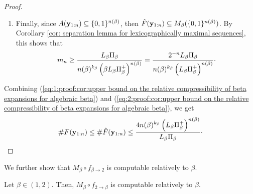 \begin{proof}
\begin{enumerate}[label=(\alph*)]
\begin{equation}
        \end{equation}
        \item Finally, since $A({\bf y}_{1:n}) \subseteq \{0,1\}^{n(\beta)}$, then $\hat F({\bf y}_{1:n}) \subseteq M_\beta(\{0,1\}^{n(\beta)})$. By Corollary \ref{cor: separation lemma for lexicographically maximal sequences}, this shows that 
        \begin{equation}\label{eq:2:proof:cor:upper bound on the relative compressibility of beta expansions for algebraic beta}
            m_n \geq \frac{L_\beta\Pi_\beta}{\displaystyle  n(\beta)^{k_\beta}\left(\beta L_\beta \Pi_\beta^+\right)^{n(\beta)}} = \frac{2^{-n}L_\beta\Pi_\beta}{\displaystyle n(\beta)^{k_\beta}\left(L_\beta \Pi_\beta^+\right)^{n(\beta)}}\cdot
        \end{equation}
    \end{enumerate}
    Combining (\ref{eq:1:proof:cor:upper bound on the relative compressibility of beta expansions for algebraic beta}) and (\ref{eq:2:proof:cor:upper bound on the relative compressibility of beta expansions for algebraic beta}), we get 
    \begin{equation}
       \#F({\bf y}_{1:n}) \leq \# \hat F({\bf y}_{1:n}) \leq \frac{\displaystyle  4n(\beta)^{k_\beta}\left(L_\beta \Pi_\beta^+ \right)^{n(\beta)}}{L_\beta \Pi_\beta}\cdot
    \end{equation}
\end{proof}
\noindent We further show that $M_\beta \circ f_{\beta \to 2}$ is computable relatively to $\beta$.
\begin{lemma}\label{cor:M is computable for algebraic beta}
    Let $\beta \in (1,2)$. Then, $M_\beta \circ f_{2 \to \beta}$ is computable relatively to $\beta$.
\end{lemma}
